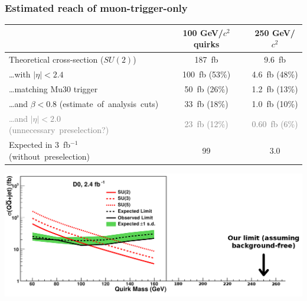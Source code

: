 \documentclass[compress]{beamer}
\begin{document}
\begin{frame}
\frametitle{Estimated reach of muon-trigger-only}

\vspace{0.5 cm}
\renewcommand{\arraystretch}{1.2}
\begin{tabular}{l c c}
& 100 GeV/$c^2$ quirks & 250 GeV/$c^2$ \\\hline
Theoretical cross-section ($SU(2)$) & 187~fb & 9.6~fb \\
\ldots with $|\eta| < 2.4$ & 100~fb (53\%) & 4.6~fb (48\%) \\
\ldots matching Mu30 trigger & 50~fb (26\%) & 1.2~fb (13\%) \\
\ldots and $\beta < 0.8$ \mbox{(estimate of analysis cuts)\hspace{-0.8 cm}} & 33~fb (18\%) & 1.0~fb (10\%) \\
\textcolor{gray}{\ldots and $|\eta| < 2.0$ \mbox{(unnecessary preselection?)\hspace{-0.8 cm}}} & \textcolor{gray}{23~fb (12\%)} & \textcolor{gray}{0.60~fb (6\%)} \\\hline
Expected in 3~fb$^{-1}$ \mbox{(without preselection)\hspace{-0.8 cm}} & 99 & 3.0 \\
\end{tabular}

\begin{center}
\includegraphics[width=0.9\linewidth]{d0_limit.png}
\end{center}
\end{frame}

\end{document}
